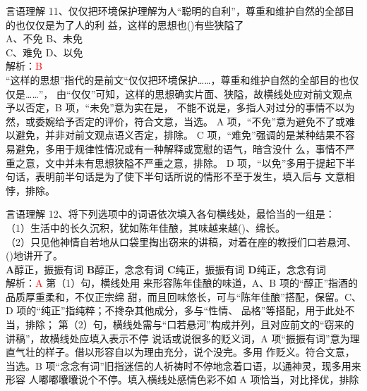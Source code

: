 \documentclass[aspectratio=169]{beamer}
\begin{document}
\begin{frame}[t]{言语理解}
    11、仅仅把环境保护理解为人“聪明的自利”，尊重和维护自然的全部目的也仅仅是为了人的利
    益，这样的思想也()有些狭隘了\\
    A、不免 \qquad B、未免\\
    C、难免 \qquad  D、以免\\
    解析：\textcolor{red}{B}\\
    “这样的思想”指代的是前文“仅仅把环境保护……，尊重和维护自然的全部目的也仅仅是……”，
    由“仅仅”可知，这样的思想确实片面、狭隘，故横线处应对前文观点予以否定，B 项，“未免”意为实在是，
    不能不说是，多指人对过分的事情不以为然，或委婉给予否定的评价，符合文意，当选。
    A 项，“不免”意为避免不了或难以避免，并非对前文观点语义否定，排除。
    C 项，“难免”强调的是某种结果不容易避免，多用于规律性情况或有一种解释或宽慰的语气，暗含没什
    么，事情不严重之意，文中并未有思想狭隘不严重之意，排除。
    D 项，“以免”多用于提起下半句话，表明前半句话是为了使下半句话所说的情形不至于发生，填入后与
    文意相悖，排除。
\end{frame}


\begin{frame}[t]{言语理解}
    12、将下列选项中的词语依次填入各句横线处，最恰当的一组是：\\
    （1）生活中的长久沉积，犹如陈年佳酿，其味越来越()、绵长。\\
    （2）只见他神情自若地从口袋里掏出窃来的讲稿，对着在座的教授们口若悬河、()地讲开了。\\
    \textbf{A}醇正，振振有词
    \textbf{B}醇正，念念有词
    \textbf{C}纯正，振振有词
    \textbf{D}纯正，念念有词\\
    解析：\textcolor{red}{A}
    第（1）句，横线处用  来形容陈年佳酿的味道，A、B 项的“醇正”指酒的品质厚重柔和，不仅正宗绵
    甜，而且回味悠长，可与“陈年佳酿”搭配，保留。C、D 项的“纯正”指纯粹；不搀杂其他成分，多与“性情、
    品格”等搭配，用于此处不当，排除；
    第（2）句，横线处需与“口若悬河”构成并列，且对应前文的“窃来的讲稿”，故横线处应填入表示不停
    说话或说很多的贬义词，A 项“振振有词”意为理直气壮的样子。借以形容自以为理由充分，说个没完。多用
    作贬义。符合文意，当选。B 项“念念有词”旧指迷信的人祈祷时不停地念着口语，以通神灵，现多用来形容
    人嘟嘟囔囔说个不停。填入横线处感情色彩不如 A 项恰当，对比择优，排除
\end{frame}
\end{document}
